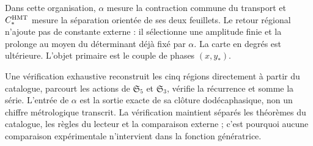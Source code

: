 Dans cette organisation, \(\alpha\) mesure la contraction commune du transport et
\(C_*^{\rm HMT}\) mesure la séparation orientée de ses deux feuillets. Le retour
régional n'ajoute pas de constante externe : il sélectionne une amplitude finie et la
prolonge au moyen du déterminant déjà fixé par \(\alpha\). La carte en
degrés est ultérieure. L'objet primaire est le couple de phases \((x,y_*)\).

Une vérification exhaustive reconstruit les cinq régions directement
à partir du catalogue, parcourt les actions de
\(\mathfrak S_5\) et \(\mathfrak S_3\), vérifie la récurrence et somme la
série. L'entrée de \(\alpha\) est la sortie exacte de sa clôture
dodécaphasique, non un chiffre métrologique transcrit. La vérification maintient
séparés les théorèmes du catalogue, les règles du lecteur et la comparaison
externe ; c'est pourquoi aucune comparaison expérimentale n'intervient dans la fonction
génératrice.
